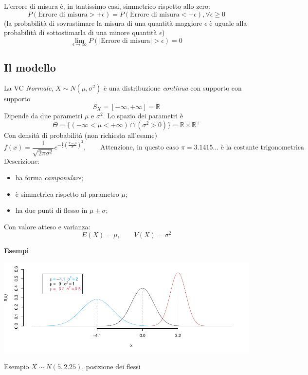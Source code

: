 \documentclass[
  11pt,
]{book}
\providecommand{\tightlist}{%
  \setlength{\itemsep}{0pt}\setlength{\parskip}{0pt}}
\theoremstyle{mytheoremstyle}
\theoremstyle{mydefstyle}
\begin{document}
L'errore di misura è, in tantissimo casi, simmetrico rispetto allo zero:
\[P(\text{Errore di misura}>+\epsilon)=P(\text{Errore di misura}<-\epsilon), \forall \epsilon\geq 0\]
(la probabilità di sovrastimare la misura di una quantità maggiore \(\epsilon\) è uguale alla probabilità di sottostimarla di una minore quantità \(\epsilon\))
\[\lim_{\epsilon\to\infty}P(|\text{Errore di misura}|> \epsilon)=0\]

\subsection{Il modello}\label{il-modello-2}

La VC \emph{Normale}, \(X\sim N(\mu,\sigma^2)\) è una distribuzione \emph{continua} con supporto
con supporto
\[S_X=[-\infty,+\infty]=\mathbb{R}\]
Dipende da due parametri \(\mu\) e \(\sigma^2\). Lo spazio dei parametri è
\[\Theta=\{(-\infty<\mu<+\infty)\cap(\sigma^2>0)\}=\mathbb{R}\times\mathbb{R}^+\]
Con densità di probabilità (non richiesta all'esame)
\[f(x)=\frac 1 {\sqrt{2\pi\sigma^2}}e^{-\frac 1 2 \left(\frac{x-\mu}{\sigma}\right)^2}, \qquad \text{Attenzione, in questo caso $\pi=3.1415...$ è la costante trigonometrica}\]
Descrizione:

\begin{itemize}
\tightlist
\item
  ha forma \emph{campanulare};
\item
  è simmetrica rispetto al parametro \(\mu\);
\item
  ha due punti di flesso in \(\mu\pm\sigma\);
\end{itemize}

Con valore atteso e varianza:
\[E(X)=\mu, \qquad V(X)=\sigma^2\]

\textbf{Esempi}

\begin{center}\includegraphics{Appunti_di_Statistica_2025_files/figure-latex/07c-Normale-3,-1} \end{center}

Esempio \(X\sim N(5,2.25)\), posizione dei flessi
\end{document}
